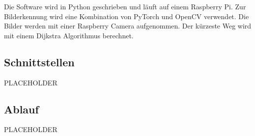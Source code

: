 Die Software wird in Python geschrieben und läuft auf einem Raspberry Pi. Zur Bilderkennung wird eine Kombination von PyTorch und OpenCV verwendet. Die Bilder werden mit einer Raspberry Camera aufgenommen. Der kürzeste Weg wird mit einem Dijkstra Algorithmus berechnet.

\subsection{Schnittstellen}

PLACEHOLDER

\subsection{Ablauf}

PLACEHOLDER